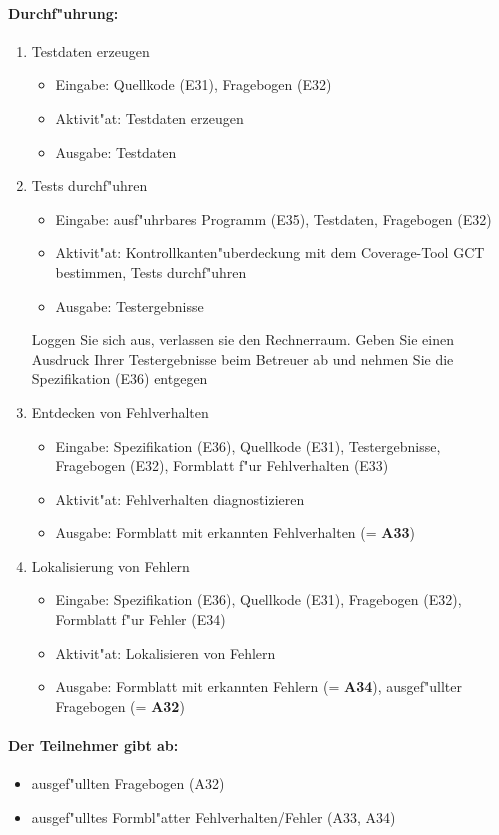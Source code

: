 \paragraph{Durchf"uhrung:} 
\begin{enumerate}
	\item Testdaten erzeugen
	\begin{itemize}
		\item Eingabe: Quellkode (E31), Fragebogen (E32)
		\item Aktivit"at: Testdaten erzeugen
		\item Ausgabe: Testdaten
	\end{itemize}
	\item Tests durchf"uhren
	\begin{itemize}
		\item Eingabe: ausf"uhrbares Programm (E35), Testdaten, Fragebogen (E32)
		\item Aktivit"at: Kontrollkanten"uberdeckung mit dem Coverage-Tool GCT 
			bestimmen, Tests durchf"uhren
		\item Ausgabe: Testergebnisse
	\end{itemize}
	Loggen Sie sich aus, verlassen sie den Rechnerraum.
	Geben Sie einen Ausdruck Ihrer Testergebnisse beim Betreuer ab und nehmen 
	Sie die Spezifikation (E36) entgegen
	\item Entdecken von Fehlverhalten
	\begin{itemize}
		\item Eingabe: Spezifikation (E36), Quellkode (E31), 
			Testergebnisse, Fragebogen (E32), Formblatt f"ur Fehlverhalten (E33)
		\item Aktivit"at: Fehlverhalten diagnostizieren
		\item Ausgabe: Formblatt mit erkannten Fehlverhalten (= {\bf A33})
	\end{itemize}
	\item Lokalisierung von Fehlern
	\begin{itemize}
		\item Eingabe: Spezifikation (E36), Quellkode (E31), 
			Fragebogen (E32), Formblatt f"ur Fehler (E34)
		\item Aktivit"at: Lokalisieren von Fehlern
		\item Ausgabe: Formblatt mit erkannten Fehlern (= {\bf A34}), 
			ausgef"ullter Fragebogen (= {\bf A32})
	\end{itemize}
\end{enumerate}

\paragraph{Der Teilnehmer gibt ab:}  
\begin{itemize}
	\item ausgef"ullten Fragebogen (A32)
	\item ausgef"ulltes Formbl"atter Fehlverhalten/Fehler (A33, A34)
\end{itemize}


